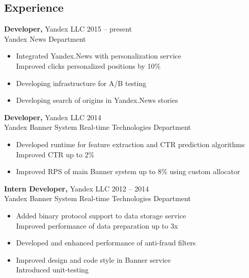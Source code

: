 \documentclass[margin]{res}
\begin{document}

\address{{\bf Contact info} \\ 1 Ambulatorny proezd, 5-2-40, Moscow, 125315  \\
+7 (915) 264-55-06 \\ tanyatik@yandex.ru, tanyatik1@gmail.com}


\begin{resume}



\section{Experience}
{\bf Developer,} Yandex LLC \hfill 2015 -- present \\
Yandex News Department
\begin{itemize} \itemsep -2pt \topsep 0ex
\item Integrated Yandex.News with personalization service \\
Improved clicks personalized positions by 10\%
\item Developing infrastructure for A/B testing
\item Developing search of origins in Yandex.News stories
\end{itemize}

 {\bf Developer,} Yandex LLC \hfill 2014 \\
Yandex Banner System Real-time Technologies Department
\begin{itemize} \itemsep -2pt \topsep 0ex
\item Developed runtime for feature extraction and CTR prediction algorithms \\
Improved CTR up to 2\%
\item Improved RPS of main Banner system up to 8\% using custom allocator
 \end{itemize}

 {\bf Intern Developer,} Yandex LLC \hfill 2012 -- 2014 \\
Yandex Banner System Real-time Technologies Department
\begin{itemize} \itemsep -2pt \topsep 0ex
\item Added binary protocol support to data storage service \\
Improved performance of data preparation up to 3x
\item Developed and enhanced performance of anti-fraud filters
\item Improved design and code style in Banner service \\
Introduced unit-testing
\end{itemize}


\end{resume}
\end{document}

